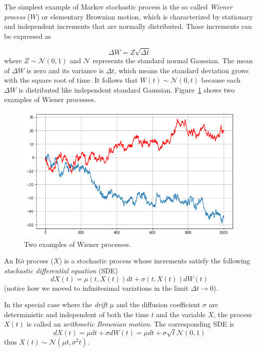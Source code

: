 The simplest example of Markov stochastic process is the so called \emph{Wiener process} ($W$) or elementary Brownian motion, which is characterized by stationary and independent increments that are normally distributed. Those increments can be expressed as

\begin{equation}
\Delta W = Z\sqrt{\Delta t}
\end{equation}
where $Z ∼ \mathcal{N}(0, 1)$ and $\mathcal{N}$ represents the standard normal Gaussian. 
The mean of $\Delta W$ is zero and its variance is $\Delta t$, which means the standard deviation grows with the square root of time. It follows that $W(t) ∼ \mathcal{N}(0, t)$ because each $\Delta W$ is distributed like independent standard Gaussian. Figure~\ref{fig:wiener_process} shows two examples of Wiener processes.

\begin{figure}[htb]
	\centering
	\includegraphics[width=0.7\linewidth]{figures/wiener_process.png}
	\caption{Two examples of Wiener processes.}
	\label{fig:wiener_process}
\end{figure}

An It$\hat{o}$ process ($X$) is a stochastic process whose increments satisfy the following \emph{stochastic differential equation} (SDE) 
\begin{equation}
dX(t) = \mu(t, X(t)) dt + \sigma(t, X(t)) dW(t)
\end{equation}
(notice how we moved to infinitesimal variations in the limit $\Delta t\rightarrow 0$).

In the special case where the \emph{drift} $\mu$ and the diffusion coefficient $\sigma$ are deterministic and independent of both the time $t$ and the variable $X$, the process $X(t)$ is called an \emph{arithmetic Brownian motion}. The corresponding SDE is
\begin{equation}
dX(t) = \mu dt + \sigma dW(t) = \mu dt + \sigma \sqrt{t} \mathcal{N}(0,1) 
\end{equation}
thus $X(t) ∼ \mathcal{N}(\mu t, \sigma^2 t)$.

